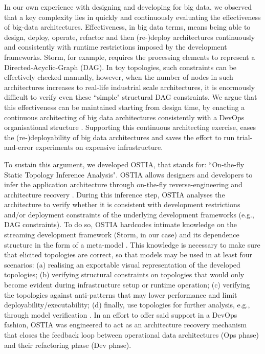 In our own experience with designing and developing for big data, we observed that a key complexity lies in quickly and continuously evaluating the effectiveness of big-data architectures. Effectiveness, in big data terms, means being able to design, deploy, operate, refactor and then (re-)deploy architectures continuously and consistently with runtime restrictions imposed by the development frameworks. Storm, for example, requires the processing elements to represent a Directed-Acyclic-Graph (DAG). In toy topologies, such constraints can be effectively checked manually, however, when the number of nodes in such architectures increases to real-life industrial scale architectures, it is enormously difficult to verify even these ``simple" structural DAG constraints.
We argue that this effectiveness can be maintained starting from design time, by enacting a continuous architecting of big data architectures consistently with a DevOps organisational structure \cite{ossslr,devops}. Supporting this continuous architecting exercise, eases the (re-)deployability of big data architectures and saves the effort to run trial-and-error experiments on expensive infrastructure.

To sustain this argument, we developed OSTIA, that stands for: ``On-the-fly Static Topology Inference Analysis". OSTIA allows designers and developers to infer the application architecture through on-the-fly reverse-engineering and architecture recovery \cite{archrec}. During this inference step, OSTIA analyses the architecture to verify whether it is consistent with development restrictions and/or deployment constraints of the underlying development frameworks (e.g., DAG constraints). To do so, OSTIA hardcodes intimate knowledge on the streaming development framework (Storm, in our case) and its dependence structure in the form of a meta-model \cite{mda}. This knowledge is necessary to make sure that elicited topologies are correct, so that models may be used in at least four scenarios: (a) realising an exportable visual representation of the developed topologies; (b) verifying structural constraints on topologies that would only become evident during infrastructure setup or runtime operation; (c) verifying the topologies against anti-patterns \cite{patternoriented2000} that may lower performance and limit deployability/executability; (d) finally, use topologies for further analysis, e.g., through model verification \cite{icsoft}. In an effort to offer said support in a DevOps fashion, OSTIA was engineered to act as an architecture recovery mechanism that closes the feedback loop between operational data architectures (Ops phase) and their refactoring phase (Dev phase). 

